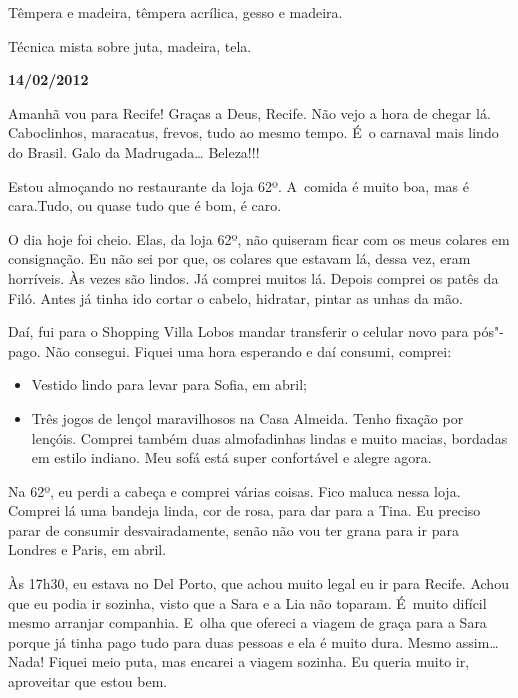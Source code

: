 Têmpera e madeira, têmpera acrílica, gesso e madeira.

Técnica mista sobre juta, madeira, tela.

\begin{center}\asterisc{}\end{center}

\begin{flushright}\textbf{}\end{flushright}

\begin{flushright}\textbf{14/02/2012}\end{flushright}


Amanhã vou para Recife! Graças a Deus, Recife. Não vejo a hora de chegar
lá. Caboclinhos, maracatus, frevos, tudo ao mesmo tempo. É~o carnaval
mais lindo do Brasil. Galo da Madrugada… Beleza!!!

Estou almoçando no restaurante da loja 62º. A~comida é muito boa, mas é
cara.Tudo, ou quase tudo que é bom, é caro.

O dia hoje foi cheio. Elas, da loja 62º, não quiseram ficar com os meus
colares em consignação. Eu não sei por que, os colares que estavam lá,
dessa vez, eram horríveis. Às vezes são lindos. Já comprei muitos lá.
Depois comprei os patês da Filó. Antes já tinha ido cortar o cabelo,
hidratar, pintar as unhas da mão.

Daí, fui para o Shopping Villa Lobos mandar transferir o celular novo
para pós"-pago. Não consegui. Fiquei uma hora esperando e daí consumi,
comprei:

\begin{itemize}
\item
  Vestido lindo para levar para Sofia, em abril;
\item
  Três jogos de lençol maravilhosos na Casa Almeida. Tenho fixação por
  lençóis. Comprei também duas almofadinhas lindas e muito macias,
  bordadas em estilo indiano. Meu sofá está super confortável e alegre
  agora.
\end{itemize}
Na 62º, eu perdi a cabeça e comprei várias coisas. Fico maluca nessa
loja. Comprei lá uma bandeja linda, cor de rosa, para dar para a Tina.
Eu preciso parar de consumir desvairadamente, senão não vou ter grana
para ir para Londres e Paris, em abril.

Às 17h30, eu estava no Del Porto, que achou muito legal eu ir para
Recife. Achou que eu podia ir sozinha, visto que a Sara e a Lia não
toparam. É~muito difícil mesmo arranjar companhia. E~olha que ofereci a
viagem de graça para a Sara porque já tinha pago tudo para duas pessoas
e ela é muito dura. Mesmo assim… Nada! Fiquei meio puta, mas
encarei a viagem sozinha. Eu queria muito ir, aproveitar que estou bem.

